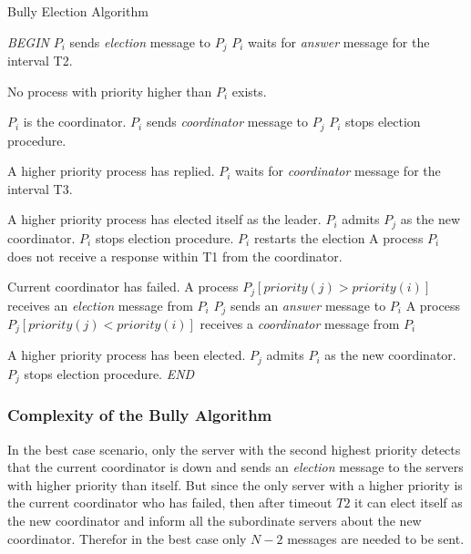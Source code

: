 \documentclass[dareport.tex]{subfiles}
\begin{document}
\begin{algorithm}[H]
	\caption{Bully Election Algorithm}
	\label{bully-algorithm}
	\begin{algorithmic}[1]
		\BState \emph{BEGIN}
			\State $P_{i}$ sends \emph{election} message to $P_{j}$
		\EndFor
		\State $P_{i}$ waits for \emph{answer} message for the interval T2.
		
		\Comment No process with priority higher than $P_{i}$ exists.
		
		\Comment $P_{i}$ is the coordinator.
				\State $P_{i}$ sends \emph{coordinator} message to $P_{j}$
			\EndFor
			\State $P_{i}$ stops election procedure.
		\Else
		
		\Comment A higher priority process has replied.
			\State $P_{i}$ waits for \emph{coordinator} message for the interval T3.
		
		\Comment A higher priority process has elected itself as the leader.
			\State $P_{i}$ admits $P_{j}$ as the new coordinator.
			\State $P_{i}$ stops election procedure.
		\Else
			\State {}
			\Comment $P_{i}$ restarts the election
		\EndIf
		\EndIf
		\EndProcedure
		\State A process $P_{i}$ does not receive a response within T1 from the coordinator.
		
		\Comment Current coordinator has failed.
		\State\indent {}
		\State A process $P_{j} \left[priority(j) > priority(i)\right]$ receives an \emph{election} message from $P_{i}$
		\State\indent $P_{j}$ sends an \emph{answer} message to $P_{i}$
		\State\indent {}
		\State A process $P_{j} \left[priority(j) < priority(i)\right]$ receives a \emph{coordinator} message from $P_{i}$
		
		\Comment A higher priority process has been elected.
		\State\indent $P_{j}$ admits $P_{i}$ as the new coordinator.
		\State\indent $P_{j}$ stops election procedure.
		\BState \emph{END}
	\end{algorithmic}
\end{algorithm}

\subsubsection{Complexity of the Bully Algorithm}\label{sssec:ba-complexity}
In the best case scenario, only the server with the second highest priority detects that the current coordinator is down and sends an \emph{election} message to the servers with higher priority than itself. But since the only server with a higher priority is the current coordinator who has failed, then after timeout $ T2 $ it can elect itself as the new coordinator and inform all the subordinate servers about the new coordinator. Therefor in the best case only $ N-2 $ messages are needed to be sent.
\end{document}
